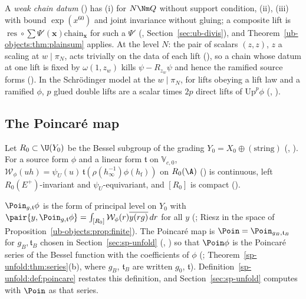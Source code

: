 A \emph{weak chain datum} () has (i) for $N\Nm Q$ without support
condition, (ii), (iii) with bound $\exp(x^{60})$ and joint invariance without gluing; a composite
lift is $\operatorname{res}\circ\sum\Psi'(\mathbf x)\mathrm{chain}_{\mathbf x}$ for such a $\Psi'$
(, Section~\ref{sec:ub-divis}),
and Theorem~\ref{ub-objects:thm:plainsum} applies. At the level $N$: the pair of scalars $(z,z)$, $z$
a scaling at $w\mid\pi_N$, acts trivially on the data of each lift
(), so a chain whose datum at one lift is fixed by
$\omega(1,z_w)$ kills $\psi-R_{z_w}\psi$ and hence the ramified source forms
(). In the Schr\"odinger model at the $w\mid\pi_N$,
for lifts obeying a lift law and a ramified $\phi$, $p$ glued double lifts are a scalar times $2p$
direct lifts of $\mathrm{Up}^p\phi$ (,
).

\subsection{The Poincar\'e map}\label{ub-objects:sec:poincare}

Let $R_0\subset\U(Y_0)$ be the Bessel subgroup of the grading $Y_0=X_0\oplus(\text{string})$
(, ). For a source form $\phi$ and a linear
form $\mathfrak t$ on $\mathbb V_{c,0}$, $\mathcal W_\phi(uh)=\psi_U(u)\,\mathfrak t(\rho(h_\infty^{-1})\phi(h_{\mathrm f}))$ on $R_0(\A)$
() is continuous, left $R_0(E^+)$-invariant and $\psi_U$-equivariant, and
$[R_0]$ is compact ().

\begin{definition}\label{ub-objects:def:poincare}
$\Poin_{g,\mathfrak t}\phi$ is the form of principal level on $Y_0$ with $\pair{y,\Poin_{g,\mathfrak t}\phi}=
\int_{[R_0]}\mathcal W_\phi(r)\overline{y(rg)}\,dr$ for all $y$ (;
Riesz in the space of Proposition~\ref{ub-objects:prop:finite}). The Poincar\'e map is
$\Poin=\Poin_{g_B,\mathfrak t_B}$ for $g_B,\mathfrak t_B$ chosen in Section~\ref{sec:sp-unfold}
(, ) so that $\Poin\phi$ is the Poincar\'e series
of the Bessel function with the coefficients of $\phi$ (;
Theorem~\ref{sp-unfold:thm:series}(b), where $g_B$, $\mathfrak t_B$ are written $g_0$, $\mathfrak t$).
Definition~\ref{sp-unfold:def:poincare} restates this definition, and Section~\ref{sec:sp-unfold}
computes with $\Poin$ as that series.
\end{definition}

